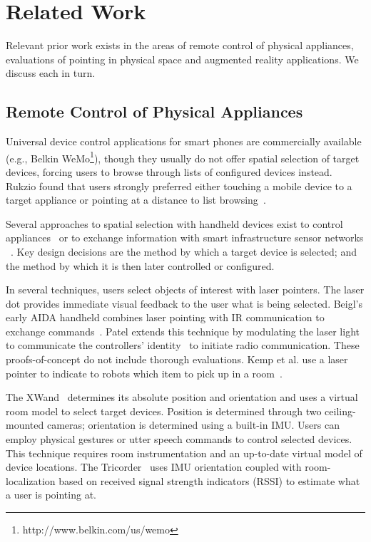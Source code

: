 \section{Related Work}
Relevant prior work exists in the areas of remote control of physical appliances, evaluations of pointing in physical space and augmented reality applications. We discuss each in turn.

\subsection{Remote Control of Physical Appliances}
Universal device control applications for smart phones are commercially available (e.g., Belkin WeMo\footnote{http://www.belkin.com/us/wemo}), though they usually do not offer spatial selection of target devices, forcing users to browse through lists of configured devices instead. Rukzio found that users strongly preferred either touching a mobile device to a target appliance or pointing at a distance to list browsing~\cite{rukzio_experimental_2006}.

Several approaches to spatial selection with handheld devices exist to control appliances~\cite{beigl_point_1999,patel_2-way_2003,wilson_xwand:_2003,schmidt_picontrol:_2012} or to exchange information with smart infrastructure sensor networks ~\cite{lifton_tricorder:_2007,mittal_ubicorder:_2011,costanza_sensortune:_2010}. Key design decisions are the method by which a target device is selected; and the method by which it is then later controlled or configured.

In several techniques, users select objects of interest with laser pointers. The laser dot provides immediate visual feedback to the user what is being selected. Beigl's early AIDA handheld combines laser pointing with IR communication to exchange commands~\cite{beigl_point_1999}. Patel extends this technique by modulating the laser light to communicate the controllers' identity~\cite{patel_2-way_2003} to initiate radio communication. These proofs-of-concept do not include thorough evaluations. Kemp et al. use a laser pointer to indicate to robots which item to pick up in a room~\cite{kemp_point-and-click_2008}. 

The XWand~\cite{wilson_xwand:_2003} determines its absolute position and orientation and uses a virtual room model to select target devices. Position is determined through two ceiling-mounted cameras; orientation is determined using a built-in IMU. Users can employ physical gestures or utter speech commands to control selected devices. This technique requires room instrumentation and an up-to-date virtual model of device locations. The Tricorder~\cite{lifton_tricorder:_2007} uses IMU orientation coupled with room-localization based on received signal strength indicators (RSSI) to estimate what a user is pointing at.

